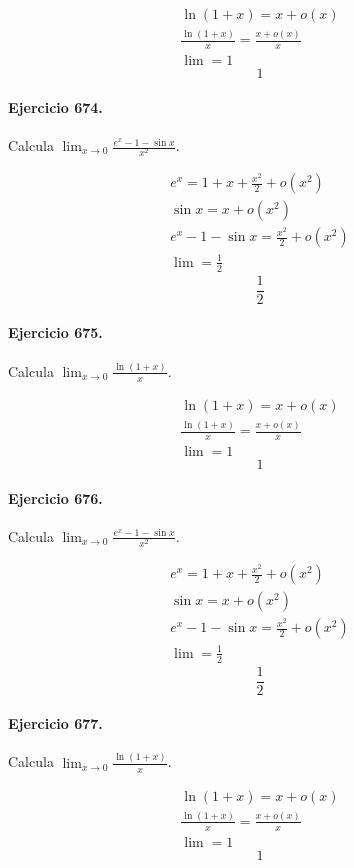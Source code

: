 \documentclass[11pt,a4paper]{article}
\begin{document}
\[
\begin{aligned}
\ln(1+x)=x+o(x)\\
\frac{\ln(1+x)}{x}=\frac{x+o(x)}{x}\\
\lim=1
\end{aligned}
\]
\[\boxed{1}\]


\paragraph{Ejercicio 674.} Calcula $\displaystyle\lim_{x\to0}\frac{e^x-1-\sin x}{x^2}$.

\[
\begin{aligned}
e^x=1+x+\frac{x^2}{2}+o(x^2)\\
\sin x=x+o(x^2)\\
e^x-1-\sin x=\frac{x^2}{2}+o(x^2)\\
\lim=\frac12
\end{aligned}
\]
\[\boxed{\frac12}\]


\paragraph{Ejercicio 675.} Calcula $\displaystyle\lim_{x\to0}\frac{\ln(1+x)}{x}$.

\[
\begin{aligned}
\ln(1+x)=x+o(x)\\
\frac{\ln(1+x)}{x}=\frac{x+o(x)}{x}\\
\lim=1
\end{aligned}
\]
\[\boxed{1}\]


\paragraph{Ejercicio 676.} Calcula $\displaystyle\lim_{x\to0}\frac{e^x-1-\sin x}{x^2}$.

\[
\begin{aligned}
e^x=1+x+\frac{x^2}{2}+o(x^2)\\
\sin x=x+o(x^2)\\
e^x-1-\sin x=\frac{x^2}{2}+o(x^2)\\
\lim=\frac12
\end{aligned}
\]
\[\boxed{\frac12}\]


\paragraph{Ejercicio 677.} Calcula $\displaystyle\lim_{x\to0}\frac{\ln(1+x)}{x}$.

\[
\begin{aligned}
\ln(1+x)=x+o(x)\\
\frac{\ln(1+x)}{x}=\frac{x+o(x)}{x}\\
\lim=1
\end{aligned}
\]
\[\boxed{1}\]
\end{document}
